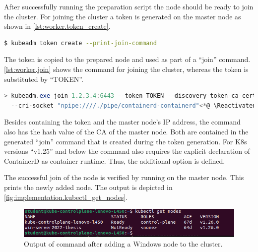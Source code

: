 
After successfully running the preparation script the node should be ready to join the cluster. For joining the cluster a token is generated on the master node as shown in \autoref{lst:worker.token_create}.
\begin{lstlisting}[label=lst:worker.token_create, caption={Command for creating a join token and printing the join command.}, language=bash, morekeywords={kubeadm}, numbers=none]
$ kubeadm token create --print-join-command
\end{lstlisting}
The token is copied to the prepared node and used as part of a \enquote{join} command. \autoref{lst:worker.join} shows the command for joining the cluster, whereas the token is substituted by \enquote{TOKEN}.
\begin{lstlisting}[label=lst:worker.join, caption={Command for joining new nodes on Windows}, language=PowerShell, morekeywords={kubeadm.exe}, numbers=none]
> kubeadm.exe join 1.2.3.4:6443 --token TOKEN --discovery-token-ca-cert-hash sha256:HASH \<*@ \Suppressnumber @*>
  --cri-socket "npipe:////./pipe/containerd-containerd"<*@ \Reactivatenumber @*>
\end{lstlisting}
Besides containing the token and the master node's \ac{IP} address, the command also has the hash value of the \ac{CA} of the master node. Both are contained in the generated \enquote{join} command that is created during the token generation. For \ac{K8s} versions \enquote{v1.25} and below the command also requires the explicit declaration of ContainerD as container runtime. Thus, the additional option  is defined.

The successful join of the node is verified by running  on the master node. This prints the newly added node. The output is depicted in \autoref{fig:implementation.kubectl_get_nodes}.
\begin{figure}[h]
	\centering
	\includegraphics[width=.98\textwidth]{Figures/kubectl_get_nodes.png}
	\caption{Output of  command after adding a Windows node to the cluster.}
	\label{fig:implementation.kubectl_get_nodes}
\end{figure}


